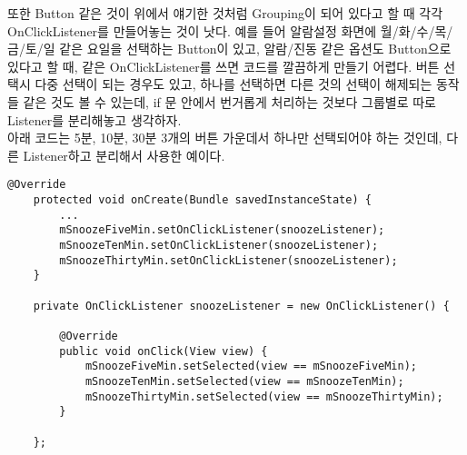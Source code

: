 또한 Button 같은 것이 위에서 얘기한 것처럼 Grouping이 되어 있다고 할 때 각각 OnClickListener를 만들어놓는 것이 낫다.
예를 들어 알람설정 화면에 월/화/수/목/금/토/일 같은 요일을 선택하는 Button이 있고, 알람/진동 같은 옵션도 Button으로 있다고 할 때, 같은 OnClickListener를 쓰면 코드를 깔끔하게 만들기 어렵다. 버튼 선택시 다중 선택이  되는 경우도 있고, 하나를 선택하면 다른 것의 선택이 해제되는 동작들 같은 것도 볼 수 있는데, if 문 안에서 번거롭게 처리하는 것보다 그룹별로 따로 Listener를 분리해놓고 생각하자.\\

아래 코드는 5분, 10분, 30분 3개의 버튼 가운데서 하나만 선택되어야 하는 것인데, 다른 Listener하고 분리해서 사용한 예이다.
\begin{lstlisting}[frame=single]
	@Override
	protected void onCreate(Bundle savedInstanceState) {
		...
		mSnoozeFiveMin.setOnClickListener(snoozeListener);
		mSnoozeTenMin.setOnClickListener(snoozeListener);
		mSnoozeThirtyMin.setOnClickListener(snoozeListener);
	}

	private OnClickListener snoozeListener = new OnClickListener() {
		
		@Override
		public void onClick(View view) {
			mSnoozeFiveMin.setSelected(view == mSnoozeFiveMin);
			mSnoozeTenMin.setSelected(view == mSnoozeTenMin);
			mSnoozeThirtyMin.setSelected(view == mSnoozeThirtyMin);
		}
		
	};
\end{lstlisting}	

\begin{comment}
\subsubsection{스레드에서 startActivity를 하지 말자.}
스레드에서 UI 코드가 동작 하지 않는다고 하지만, 그것은 어디까지나 ViewRootImpl의 checkThread를 거치는 경우 뿐이다.(즉 draw/redraw 하는 경우) 스레드에서 startActivity해도 동작은 한다.
\end{comment}